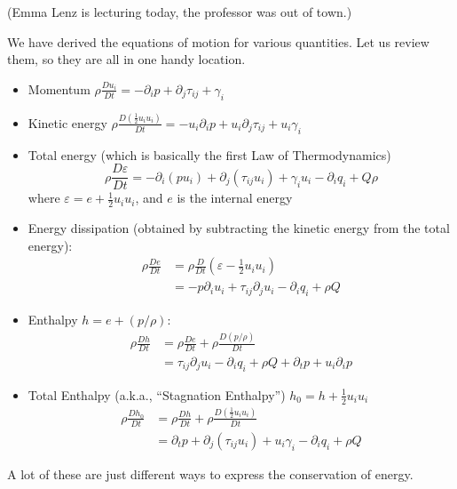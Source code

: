 
\lecture{}

(Emma Lenz is lecturing today, the professor was out of town.)

\begin{recall}
We have derived the equations of motion for various quantities. Let us
review them, so they are all in one handy location.
\begin{itemize}
\item Momentum $\displaystyle{\rho\frac{D u_{i}}{D t} = -\partial_{i}p+\partial_{j}\tau_{ij}+\gamma_{i}}$
\item Kinetic energy $\displaystyle{\rho\frac{D(\frac{1}{2}u_{i}u_{i})}{D t} = -u_{i}\partial_{i}p+u_{i}\partial_{j}\tau_{ij}+u_{i}\gamma_{i}}$
\item Total energy (which is basically the first Law of Thermodynamics)
\begin{equation*}
\rho\frac{D\varepsilon}{Dt}=-\partial_{i}(pu_{i})+\partial_{j}(\tau_{ij}u_{i})+\gamma_{i}u_{i}-\partial_{i}q_{i}+Q\rho
\end{equation*}
where $\varepsilon=e+\frac{1}{2}u_{i}u_{i}$, and $e$ is the internal energy
\item Energy dissipation (obtained by subtracting the kinetic energy
  from the total energy):
\begin{align*}
\rho\frac{De}{Dt} &= \rho\frac{D}{Dt}(\varepsilon-\frac{1}{2}u_{i}u_{i})\\
&=-p\partial_{i}u_{i}+\tau_{ij}\partial_{j}u_{i}-\partial_{i}q_{i}+\rho Q
\end{align*}
\item Enthalpy $h=e+(p/\rho)$:
\begin{align*}
\rho\frac{Dh}{Dt} &= \rho\frac{D e}{Dt}+\rho\frac{D(p/\rho)}{Dt}\\
&=\tau_{ij}\partial_{j}u_{i}-\partial_{i}q_{i}+\rho Q+\partial_{t}p+u_{i}\partial_{i}p
\end{align*}
\item Total Enthalpy (a.k.a., ``Stagnation Enthalpy'') $h_{0}=h+\frac{1}{2}u_{i}u_{i}$
\begin{align*}
\rho\frac{Dh_{0}}{Dt} &= \rho\frac{D h}{Dt}+\rho\frac{D(\frac{1}{2}u_{i}u_{i})}{Dt}\\
&=\partial_{t}p+\partial_{j}(\tau_{ij}u_{i})+u_{i}\gamma_{i}-\partial_{i}q_{i}+\rho Q
\end{align*}
\end{itemize}
A lot of these are just different ways to express the conservation of energy.
\end{recall}

